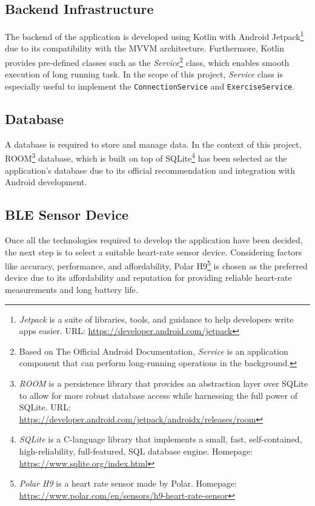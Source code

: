 \subsection{Backend Infrastructure}
The backend of the application is developed using Kotlin with Android Jetpack\footnote{\emph{Jetpack} is a suite of libraries, tools, and guidance to help developers write apps easier. URL: \url{https://developer.android.com/jetpack}} due to its compatibility with the MVVM architecture. 
Furthermore, Kotlin provides pre-defined classes such as the \emph{Service}\footnote{Based on The Official Android Documentation, \emph{Service} is an application component that can perform long-running operations in the background.\autocite{android-services}} class, which enables smooth execution of long running task. In the scope of this project, \emph{Service} class is especially useful to implement the \texttt{ConnectionService} and \texttt{ExerciseService}.

\subsection{Database}
A database is required to store and manage data. In the context of this project, ROOM\footnote{\emph{ROOM} is a persistence library that provides an abstraction layer over SQLite to allow for more robust database access while harnessing the full power of SQLite. URL: \url{https://developer.android.com/jetpack/androidx/releases/room}} database, which is built on top of SQLite\footnote{\emph{SQLite} is a C-language library that implements a small, fast, self-contained, high-reliability, full-featured, SQL database engine. Homepage: \url{https://www.sqlite.org/index.html}} has been selected as the application's database due to its official recommendation and integration with Android development.

\subsection{BLE Sensor Device}
Once all the technologies required to develop the application have been decided, the next step is to select a suitable heart-rate sensor device. Considering factors like accuracy, performance, and affordability, Polar H9\footnote{\emph{Polar H9} is a heart rate sensor made by Polar. Homepage: \url{https://www.polar.com/en/sensors/h9-heart-rate-sensor}} is chosen as the preferred device due to its affordability and reputation for providing reliable heart-rate measurements and long battery life.